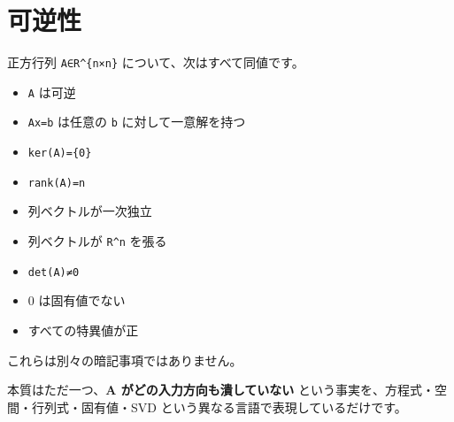 \documentclass[
  11pt,
  a4paper,
]{ltjsarticle}
\author{}
\date{}
\providecommand{\tightlist}{%
  \setlength{\itemsep}{0pt}\setlength{\parskip}{0pt}}
\begin{document}
\hypertarget{ux53efux9006ux6027}{%
\section{可逆性}\label{ux53efux9006ux6027}}

正方行列 \texttt{A∈R\^{}\{n×n\}} について、次はすべて同値です。

\begin{itemize}
\tightlist
\item
  \texttt{A} は可逆
\item
  \texttt{Ax=b} は任意の \texttt{b} に対して一意解を持つ
\item
  \texttt{ker(A)=\{0\}}
\item
  \texttt{rank(A)=n}
\item
  列ベクトルが一次独立
\item
  列ベクトルが \texttt{R\^{}n} を張る
\item
  \texttt{det(A)≠0}
\item
  0 は固有値でない
\item
  すべての特異値が正
\end{itemize}

これらは別々の暗記事項ではありません。

本質はただ一つ、\textbf{A がどの入力方向も潰していない}
という事実を、方程式・空間・行列式・固有値・SVD
という異なる言語で表現しているだけです。
\end{document}
